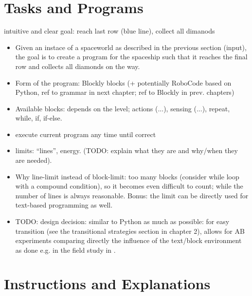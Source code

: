 



\section{Tasks and Programs}
\label{sec:robomission.programs}

intuitive and clear goal: reach last row (blue line), collect all dimanods

\begin{itemize}
\item Given an instace of a spaceworld as described in the previous section
(input), the goal is to create a program for the spaceship such that it reaches
the final row and collects all diamonds on the way.
\item Form of the program: Blockly blocks (+ potentially RoboCode based on
Python, ref to grammar in next chapter; ref to Blockly in prev. chapters)
\item Available blocks: depends on the level;
  actions (...), sensing (...), repeat, while, if, if-else.
\item execute current program any time until correct
\item limits: ``lines'', energy.
  (TODO: explain what they are and why/when they are needed).
\item Why line-limit instead of block-limit: too many blocks (consider while
  loop with a compound condition), so it becomes even difficult to count;
  while the number of lines is always reasonable.
  Bonus: the limit can be directly used for text-based programming as well.
\item TODO: design decision: similar to Python as much as possible: for easy transition
(see the transitional strategies section in chapter 2), allows for AB experiments
comparing directly the influence of the text/block environment as done e.g.
in the field study in \cite{comparing-blocks-text-weintrop2017}.
\end{itemize}


\section{Instructions and Explanations}

